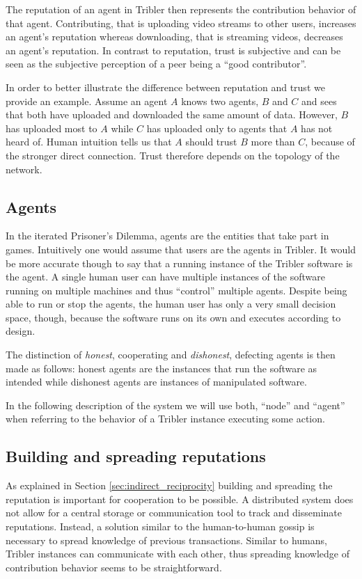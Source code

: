 The reputation of an agent in Tribler then represents the 
contribution behavior of that agent. Contributing, that is uploading video streams to other users,
increases an agent's reputation whereas downloading, that is streaming videos, decreases an agent's 
reputation. In contrast to 
reputation, trust is subjective and can be seen as the subjective perception of a peer being a 
``good contributor''. 

In order to better illustrate the difference between reputation and trust we provide an example.
Assume an agent $A$ knows two agents, $B$ and $C$ and sees that both have uploaded and downloaded 
the same amount of data. However, $B$ has uploaded most to $A$ while $C$ has uploaded only to 
agents that $A$ has not heard of. Human intuition tells us that $A$ should trust $B$ more than $C$, 
because of the stronger direct connection. Trust therefore depends on the topology of the network.

\subsection{Agents}
In the iterated Prisoner's Dilemma, agents are the entities that take part in games. Intuitively one
would assume that users are the agents in Tribler. It would be more accurate though to say that a 
running instance of the Tribler software is the agent. A single human user can have multiple 
instances of the software running on multiple machines and thus ``control'' multiple agents. Despite
being able to run or stop the agents, the human user has only a very small decision space, though, 
because the software runs on its own and executes according to design. 

The distinction of \textit{honest}, cooperating and \textit{dishonest}, defecting agents is then made as follows: honest agents are the 
instances that run the software as intended while dishonest agents are instances of manipulated 
software. 

In the following description of the system we will use both, ``node'' and ``agent'' when referring to the 
behavior of a Tribler instance executing some action. 

\subsection{Building and spreading reputations}
As explained in Section \ref{sec:indirect_reciprocity} building and spreading the reputation is 
important for cooperation to be possible. A distributed system does not allow for a central storage
or communication tool to track and disseminate reputations. Instead, a solution similar to the
human-to-human gossip is necessary to spread knowledge of previous transactions. Similar to humans, 
Tribler instances can communicate with each other, thus spreading knowledge of contribution behavior
seems to be straightforward. 

